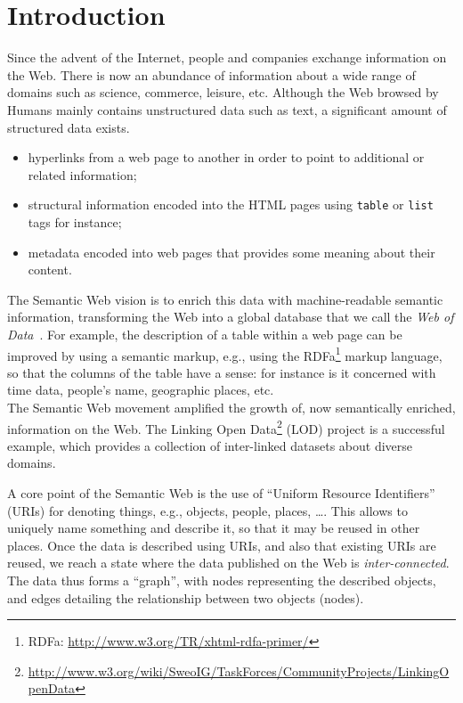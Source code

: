 \chapter{Introduction}
\label{chap:introduction}

Since the advent of the Internet, people and companies exchange information on the Web. There is now an abundance of information about a wide range of domains such as science, commerce, leisure, etc. Although the Web browsed by Humans mainly contains unstructured data such as text, a significant amount of structured data exists.

\begin{itemize}
\item hyperlinks from a web page to another in order to point to additional or related information;
\item structural information encoded into the HTML pages using \texttt{table} or \texttt{list} tags for instance;
\item metadata encoded into web pages that provides some meaning about their content.
\end{itemize}

The Semantic Web vision is to enrich this data with machine-readable semantic information, transforming the Web into a global database that we call the \emph{Web of Data}~\cite{bizer:2009:linked}. For example, the description of a table within a web page can be improved by using a semantic markup, e.g., using the RDFa\footnote{RDFa: \url{http://www.w3.org/TR/xhtml-rdfa-primer/}} markup language, so that the columns of the table have a sense: for instance is it concerned with time data, people's name, geographic places, etc.\\

The Semantic Web movement amplified the growth of, now semantically enriched, information on the Web. The Linking Open Data\footnote{\url{http://www.w3.org/wiki/SweoIG/TaskForces/CommunityProjects/LinkingOpenData}} (LOD) project is a successful example, which provides a collection of inter-linked datasets about diverse domains.

A core point of the Semantic Web is the use of ``Uniform Resource Identifiers'' (URIs) for denoting things, e.g., objects, people, places, \ldots. This allows to uniquely name something and describe it, so that it may be reused in other places. Once the data is described using URIs, and also that existing URIs are reused, we reach a state where the data published on the Web is \emph{inter-connected}. The data thus forms a ``graph'', with nodes representing the described objects, and edges detailing the relationship between two objects (nodes).

